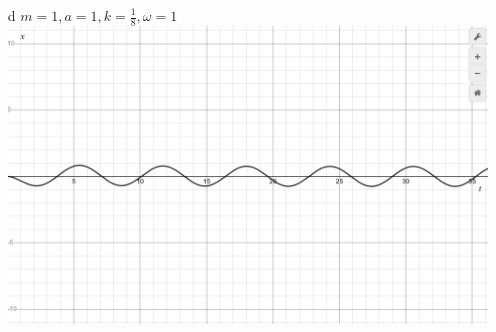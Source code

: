 \documentclass[12pt, letterpaper]{article}
\begin{document}
\begin{enumerate}
\begin{enumerate}
		\item[d] $m=1,a=1,k=\frac{1}{8},\omega=1$\\
		\includegraphics[scale=0.3]{7d292hw6.png}
	\end{enumerate}
\end{enumerate}
\end{document}
